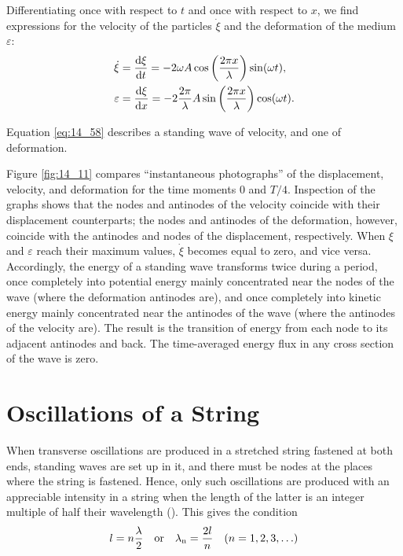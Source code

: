 Differentiating  once with respect to $t$ and once with respect to $x$, we find expressions for the velocity of the particles $\dot{\xi}$ and the deformation of the medium $\varepsilon$:
\begin{align}
	\dot{\xi} &= \dfrac{\mathrm{d}\xi}{\mathrm{d} t} = - 2 \omega A \cos\left( \frac{2\pi x}{\lambda} \right) \sin(\omega t), \label{eq:14_58}\\
	\varepsilon &= \dfrac{\mathrm{d}\xi}{\mathrm{d} x} = - 2 \frac{2\pi}{\lambda} A \sin\left( \frac{2\pi x}{\lambda} \right) \cos(\omega t). \label{eq:14_59}
\end{align}

\noindent
Equation \eqref{eq:14_58} describes a standing wave of velocity, and  one of deformation.

Figure \ref{fig:14_11} compares ``instantaneous photographs'' of the displacement, velocity, and deformation for the time moments $0$ and $T/4$. Inspection of the graphs shows that the nodes and antinodes of the velocity coincide with their displacement counterparts; the nodes and antinodes of the deformation, however, coincide with the antinodes and nodes of the displacement, respectively.
When $\xi$ and $\varepsilon$ reach their maximum values, $\dot{\xi}$ becomes equal to zero, and vice versa.
Accordingly, the energy of a standing wave transforms twice during a period, once completely into potential energy mainly concentrated near the nodes of the wave (where the deformation antinodes are), and once completely into kinetic energy mainly concentrated near the antinodes of the wave (where the antinodes of the velocity are).
The result is the transition of energy from each node to its adjacent antinodes and back.
The time-averaged energy flux in any cross section of the wave is zero.

\section{Oscillations of a String}\label{sec:14_8}

When transverse oscillations are produced in a stretched string fastened at both ends, standing waves are set up in it, and there must be nodes at the places where the string is fastened.
Hence, only such oscillations are produced with an appreciable intensity in a string when the length of the latter is an integer multiple of half their wavelength ().
This gives the condition
\begin{equation}\label{eq:14_60}
	l = n \frac{\lambda}{2}\quad \text{or}\quad \lambda_{\text{n}} = \frac{2l}{n}\quad (n = 1, 2, 3, \ldots)
\end{equation}

